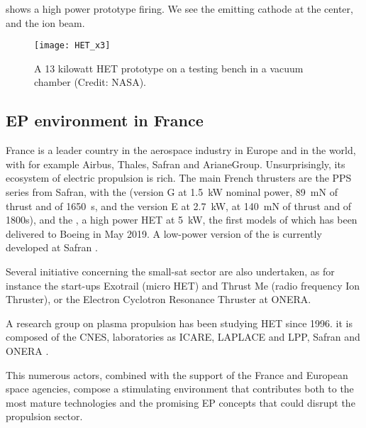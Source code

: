   shows a high power prototype firing.
 We see the emitting cathode at the center, and the ion beam.
 \begin{figure}[hbtp]
   \centering
   \texttt{[image: HET\_x3]}
   \caption{A 13 kilowatt \ac{HET} prototype on a testing bench in a vacuum chamber (Credit: NASA).  }
   \label{fig-13kWHET}
 \end{figure}
 
 
 \subsection*{\ac{EP} environment in France} \label{subsec-HET_thruster}
 
 France is a leader country in the aerospace industry in Europe and in the world, with for example Airbus, Thales, Safran and ArianeGroup.
 Unsurprisingly, its ecosystem of electric propulsion is rich.
 The main French thrusters are the PPS series from Safran, with the  (version G at 1.5~kW nominal power, 89~mN of thrust and \Isp of 1650~s, and the version E at 2.7~kW, at 140~mN of thrust and \Isp of 1800s), and the , a high power \ac{HET} at 5~kW, the first models of which has been delivered to Boeing in May 2019.
 A low-power version of the \PPS{}  is currently developed at Safran \citep{vaudolon2018}.

 
 Several initiative concerning the small-sat sector are also undertaken, as for instance the start-ups Exotrail (micro \ac{HET}) and Thrust Me (radio frequency Ion Thruster), or the Electron Cyclotron Resonance Thruster at ONERA.
 
 A research group on plasma propulsion has been studying \ac{HET} since 1996.
 it is composed of the \ac{CNES}, laboratories as ICARE, LAPLACE and LPP, Safran and ONERA \citep{boniface2017}.
 
 This numerous actors, combined with the support of the France and European space agencies, compose a stimulating environment that contributes both to the most mature technologies and the promising \ac{EP} concepts that could disrupt the propulsion sector.
 